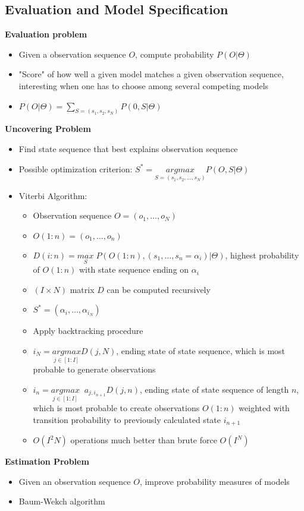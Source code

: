 \documentclass{scrartcl}
\begin{document}
\subsection*{Evaluation and Model Specification}
\textbf{Evaluation problem}
\begin{itemize}
    \item
        Given a observation sequence $O$, compute probability $P(O|\Theta)$
    \item
        "Score" of how well a given model matches a given observation sequence, interesting when one has to choose among several competing models
    \item
        $P(O|\Theta) = \sum_{S=(s_1, s_2, s_N)} P(0, S|\Theta)$
\end{itemize}
\textbf{Uncovering Problem}
\begin{itemize}
    \item
        Find state sequence that best explains observation sequence 
    \item
        Possible optimization criterion:
        $S^* = \underset{S = (s_1, s_2, \dots, s_N)}{argmax} P(O,S|\Theta)$
    \item
        Viterbi Algorithm:
        \begin{itemize}
            \item
                Observation sequence $O=(o_1, \dots, o_N)$
            \item
                $O(1:n) = (o_1, \dots, o_n)$
            \item
                $D(i:n) = \underset{S}{max} \; P(O(1:n), (s_1, \dots, s_n=\alpha_i)|\Theta)$, highest probability of $O(1:n)$ with state sequence ending on $\alpha_i$
            \item
                $(I \times N)$ matrix $D$ can be computed recursively\\
            \item
                $ S^* = (\alpha_i, \dots, \alpha_{i_N})$
            \item
                Apply backtracking procedure
            \item
                $i_N = \underset{j \in [1:I]}{argmax} D(j, N)$, ending state of state sequence, which is most probable to generate observations
            \item
                $i_n = \underset{j \in [1:I]}{argmax} \; \; a_{j, i_{n+1}}D(j, n)$, ending state of state sequence of length $n$, which is most probable to create observations $O(1:n)$ weighted with transition probability to previously calculated state $i_{n+1}$\\
            \item
                $O(I^2 N)$ operations much better than brute force $O(I^N)$
        \end{itemize}
\end{itemize}
\textbf{Estimation Problem}
\begin{itemize}
    \item
        Given an observation sequence $O$, improve probability measures of models
    \item
        Baum-Wekch algorithm
\end{itemize}
\end{document}
